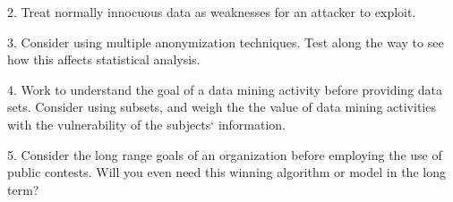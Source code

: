 \documentclass[10pt,journal,compsoc]{IEEEtran}
\begin{document}
2.	Treat normally innocuous data as weaknesses for an attacker to exploit.

3.	Consider using multiple anonymization techniques. Test along the way to see how this affects statistical analysis.

4.	Work to understand the goal of a data mining activity before providing data sets. Consider using subsets, and weigh the the value of data mining activities with the vulnerability of the subjects‘ information.

5.	Consider the long range goals of an organization before employing the use of public contests. Will you even need this winning algorithm or model in the long term?





%
%

\end{document}
